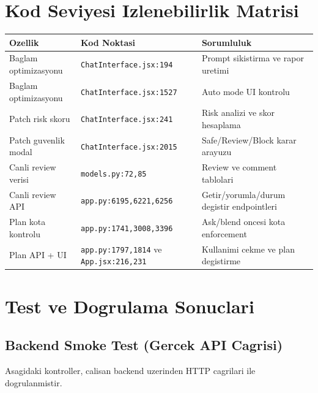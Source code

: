 \documentclass[12pt,a4paper]{article}
\begin{document}
\section{Kod Seviyesi Izlenebilirlik Matrisi}
\begin{longtable}{@{} P{3.5cm} P{4.9cm} P{6.2cm} @{} }
\toprule
Ozellik & Kod Noktasi & Sorumluluk \\
\midrule
Baglam optimizasyonu & \texttt{ChatInterface.jsx:194} & Prompt sikistirma ve rapor uretimi \\
Baglam optimizasyonu & \texttt{ChatInterface.jsx:1527} & Auto mode UI kontrolu \\
Patch risk skoru & \texttt{ChatInterface.jsx:241} & Risk analizi ve skor hesaplama \\
Patch guvenlik modal & \texttt{ChatInterface.jsx:2015} & Safe/Review/Block karar arayuzu \\
Canli review verisi & \texttt{models.py:72,85} & Review ve comment tablolari \\
Canli review API & \texttt{app.py:6195,6221,6256} & Getir/yorumla/durum degistir endpointleri \\
Plan kota kontrolu & \texttt{app.py:1741,3008,3396} & Ask/blend oncesi kota enforcement \\
Plan API + UI & \texttt{app.py:1797,1814} ve \texttt{App.jsx:216,231} & Kullanimi cekme ve plan degistirme \\
\bottomrule
\end{longtable}

\section{Test ve Dogrulama Sonuclari}
\subsection{Backend Smoke Test (Gercek API Cagrisi)}
Asagidaki kontroller, calisan backend uzerinden HTTP cagrilari ile dogrulanmistir.
\end{document}
